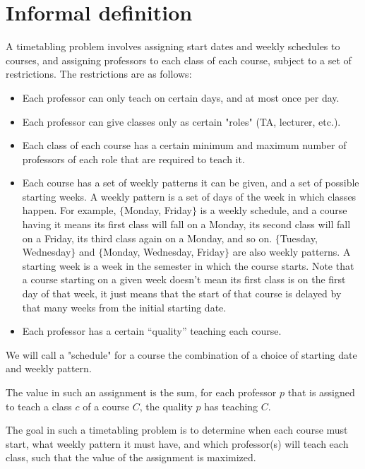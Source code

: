 \section{Informal definition}

A timetabling problem involves assigning start dates and weekly schedules to courses, and assigning professors to each class of each course, subject to a set of restrictions. The restrictions are as follows:

\begin{itemize}
\item Each professor can only teach on certain days, and at most once per day.
\item Each professor can give classes only as certain "roles" (TA, lecturer, etc.).
\item Each class of each course has a certain minimum and maximum number of professors of each role that are required to teach it.
\item Each course has a set of weekly patterns it can be given, and a set of possible starting weeks. A weekly pattern is a set of days of the week in which classes happen. For example, $\{$Monday, Friday$\}$ is a weekly schedule, and a course having it means its first class will fall on a Monday, its second class will fall on a Friday, its third class again on a Monday, and so on. $\{$Tuesday, Wednesday$\}$ and $\{$Monday, Wednesday, Friday$\}$ are also weekly patterns. A starting week is a week in the semester in which the course starts. Note that a course starting on a given week doesn't mean its first class is on the first day of that week, it just means that the start of that course is delayed by that many weeks from the initial starting date.
\item Each professor has a certain ``quality'' teaching each course.
\end{itemize}

We will call a "schedule" for a course the combination of a choice of starting date and weekly pattern.

The value in such an assignment is the sum, for each professor $p$ that is assigned to teach a class $c$ of a course $C$, the quality $p$ has teaching $C$.

The goal in such a timetabling problem is to determine when each course must start, what weekly pattern it must have, and which professor(s) will teach each class, such that the value of the assignment is maximized.

